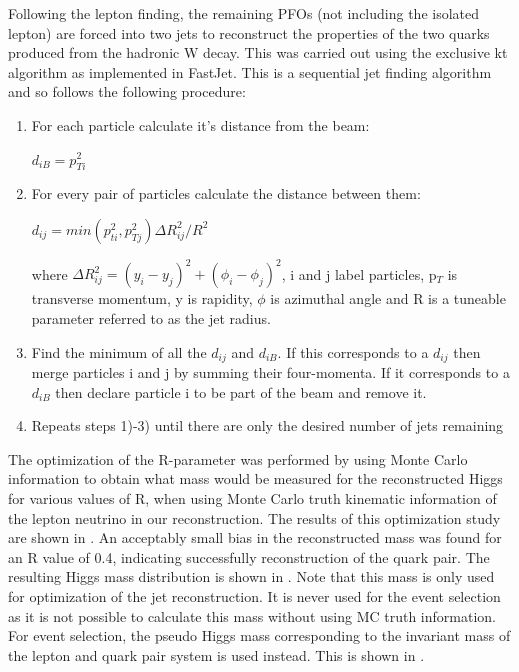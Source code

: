 Following the lepton finding, the remaining PFOs (not including the isolated lepton) are forced into two jets to reconstruct the properties of the two quarks produced from the hadronic W decay. This was carried out using the exclusive kt algorithm as implemented in FastJet. This is a sequential jet finding algorithm and so follows the following procedure:

\begin{enumerate}
\item For each particle calculate it's distance from the beam:
\begin{center}
  $d_{iB} = p_{Ti}^2$
\end{center}
\item For every pair of particles calculate the distance between them:
\begin{center}
  $d_{ij}=min(p_{ti}^2,p_{Tj}^2)\Delta R_{ij}^2/R^2$
\end{center}
where $\Delta R_{ij}^2=(y_i-y_j)^2 + (\phi_i-\phi_j)^2$, i and j label particles, p$_T$ is transverse momentum, y is rapidity, $\phi$ is azimuthal angle and R is a tuneable parameter referred to as the jet radius.
\item Find the minimum of all the $d_{ij}$ and $d_{iB}$. If this corresponds to a $d_{ij}$ then merge particles i and j by summing their four-momenta. If it corresponds to a $d_{iB}$ then declare particle i to be part of the beam and remove it.
\item Repeats steps 1)-3) until there are only the desired number of jets remaining
\end{enumerate}

The optimization of the R-parameter was performed by using Monte Carlo information to obtain what mass would be measured for the reconstructed Higgs for various values of R, when using Monte Carlo truth kinematic information of the lepton neutrino in our reconstruction. The results of this optimization study are shown in . An acceptably small bias in the reconstructed mass was found for an R value of 0.4, indicating successfully reconstruction of the quark pair. The resulting Higgs mass distribution is shown in . Note that this mass is only used for optimization of the jet reconstruction. It is never used for the event selection as it is not possible to calculate this mass without using MC truth information. For event selection, the pseudo Higgs mass corresponding to the invariant mass of the lepton and quark pair system is used instead. This is shown in .



